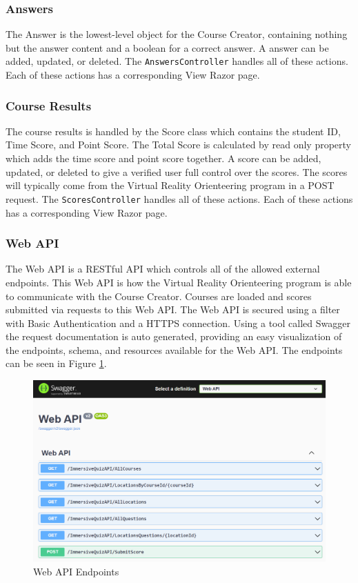 \subsubsection{Answers}
The Answer is the lowest-level object for the Course Creator, containing nothing but the answer content and a boolean for a correct answer.  A answer can be added, updated, or deleted. The \lstinline{AnswersController} handles all of these actions. Each of these actions has a corresponding View Razor page. 

\subsubsection{Course Results}
The course results is handled by the Score class which contains the student ID, Time Score, and Point Score. The Total Score is calculated by read only property which adds the time score and point score together.  A score can be added, updated, or deleted to give a verified user full control over the scores. The scores will typically come from the Virtual Reality Orienteering program in a POST request. The \lstinline{ScoresController} handles all of these actions. Each of these actions has a corresponding View Razor page. 

\subsubsection{Web API}
The Web API is a RESTful API which controls all of the allowed external endpoints. This Web API is how the Virtual Reality Orienteering program is able to communicate with the Course Creator. Courses are loaded and scores submitted via requests to this Web API. The Web API is secured using a filter with Basic Authentication and a HTTPS connection. Using a tool called Swagger the request documentation is auto generated, providing an easy visualization of the endpoints, schema, and resources available for the Web API. The endpoints can be seen in Figure \ref{fig:WebApiEndpoints}.
\begin{figure}[htb]
	\centering
	\includegraphics[width=.9\textwidth]{Implementation/assets/web-api-endpoints.png}
	\caption[Web API Endpoints]{\label{fig:WebApiEndpoints}Web API Endpoints}
\end{figure}

